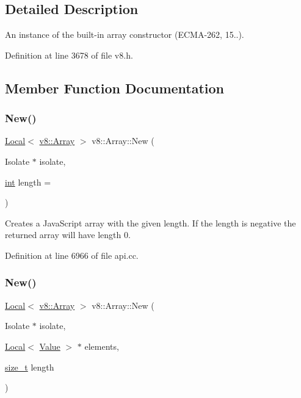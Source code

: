 \subsection{Detailed Description}
An instance of the built-\/in array constructor (E\+C\+M\+A-\/262, 15..). 

Definition at line 3678 of file v8.\+h.



\subsection{Member Function Documentation}
\mbox{\label{classv8_1_1Array_a369cbd533bf7aa08d9ce1e2ddb4e6536}} 
\subsubsection{\texorpdfstring{New()}{New()}\hspace{0.1cm}{\footnotesize\ttfamily [1/2]}}
{\footnotesize\ttfamily \mbox{\hyperlink{classv8_1_1Local}{Local}}$<$ \mbox{\hyperlink{classv8_1_1Array}{v8\+::\+Array}} $>$ v8\+::\+Array\+::\+New (\begin{DoxyParamCaption}\item[{Isolate $\ast$}]{isolate,  }\item[{\mbox{\hyperlink{classint}{int}}}]{length = {} }\end{DoxyParamCaption})\hspace{0.3cm}{\ttfamily [static]}}

Creates a Java\+Script array with the given length. If the length is negative the returned array will have length 0. 

Definition at line 6966 of file api.\+cc.

\mbox{\label{classv8_1_1Array_aab9ef356c6af82a86d44099c0aeca232}} 
\subsubsection{\texorpdfstring{New()}{New()}\hspace{0.1cm}{\footnotesize\ttfamily [2/2]}}
{\footnotesize\ttfamily \mbox{\hyperlink{classv8_1_1Local}{Local}}$<$ \mbox{\hyperlink{classv8_1_1Array}{v8\+::\+Array}} $>$ v8\+::\+Array\+::\+New (\begin{DoxyParamCaption}\item[{Isolate $\ast$}]{isolate,  }\item[{\mbox{\hyperlink{classv8_1_1Local}{Local}}$<$ \mbox{\hyperlink{classv8_1_1Value}{Value}} $>$ $\ast$}]{elements,  }\item[{\mbox{\hyperlink{classsize__t}{size\+\_\+t}}}]{length }\end{DoxyParamCaption})\hspace{0.3cm}{\ttfamily [static]}}

